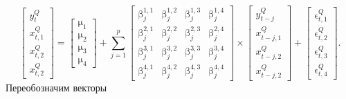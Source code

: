 \documentclass[a4paper, 14pt]{extreport}
\numberwithin{equation}{section}
\renewcommand{\beta}{\upbeta}
\renewcommand{\epsilon}{\upvarepsilon}
\renewcommand{\mu}{\upmu}
\numberwithin{equation}{section}
\begin{document}
	\begin{equation}
		\begin{bmatrix}
			y_t^Q \\[2ex] x_{t,1}^Q \\[2ex] x_{t,2}^Q \\[2ex] x_{t,2}^Q
		\end{bmatrix} 
		=
		\begin{bmatrix}
			\mu_1 \\[2ex] \mu_2 \\[2ex] \mu_3 \\[2ex] \mu_4
		\end{bmatrix} 
		+
		\sum_{j=1}^{p}
		\begin{bmatrix}
			\beta_j^{1,1} & \beta_j^{1,2} & \beta_j^{1,3} & \beta_j^{1,4} \\[2ex] 
			\beta_j^{2,1} & \beta_j^{2,2} & \beta_j^{2,3} & \beta_j^{2,4} \\[2ex] 
			\beta_j^{3,1} & \beta_j^{3,2} & \beta_j^{3,3} & \beta_j^{3,4} \\[2ex] 
			\beta_j^{4,1} & \beta_j^{4,2} & \beta_j^{4,3} & \beta_j^{4,4}
		\end{bmatrix}
		\times 
		\begin{bmatrix}
			y_{t-j}^Q \\[2ex] x_{t-j,1}^Q \\[2ex] x_{t-j,2}^Q \\[2ex] x_{t-j,2}^Q
		\end{bmatrix} 
		+
		\begin{bmatrix}
			\epsilon_{t,1}^Q \\[2ex] \epsilon_{t,2}^Q \\[2ex] \epsilon_{t,3}^Q \\[2ex] \epsilon_{t,4}^Q
		\end{bmatrix}.
	\end{equation}
	Переобозначим векторы
\end{document}
